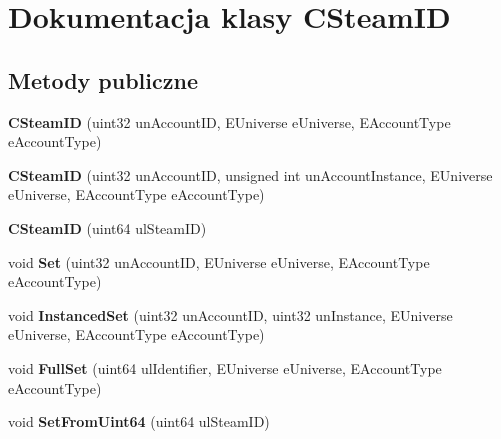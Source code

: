 \hypertarget{class_c_steam_i_d}{}\section{Dokumentacja klasy C\+Steam\+ID}
\label{class_c_steam_i_d}
\subsection*{Metody publiczne}
\begin{DoxyCompactItemize}
\item 
\mbox{\label{class_c_steam_i_d_aee9a6d20f4e904294ff5ca8f9d0f2521}} 
{\bfseries C\+Steam\+ID} (uint32 un\+Account\+ID, E\+Universe e\+Universe, E\+Account\+Type e\+Account\+Type)
\item 
\mbox{\label{class_c_steam_i_d_a66dea50fbae98a10058e86e5597fe396}} 
{\bfseries C\+Steam\+ID} (uint32 un\+Account\+ID, unsigned int un\+Account\+Instance, E\+Universe e\+Universe, E\+Account\+Type e\+Account\+Type)
\item 
\mbox{\label{class_c_steam_i_d_ab8c5add9368077f0217ea8d03e7c5743}} 
{\bfseries C\+Steam\+ID} (uint64 ul\+Steam\+ID)
\item 
\mbox{\label{class_c_steam_i_d_a46fe032f5da0e7c19154527224a28a3b}} 
void {\bfseries Set} (uint32 un\+Account\+ID, E\+Universe e\+Universe, E\+Account\+Type e\+Account\+Type)
\item 
\mbox{\label{class_c_steam_i_d_a1f511324c499386ae942ddcca19a78cf}} 
void {\bfseries Instanced\+Set} (uint32 un\+Account\+ID, uint32 un\+Instance, E\+Universe e\+Universe, E\+Account\+Type e\+Account\+Type)
\item 
\mbox{\label{class_c_steam_i_d_a6721be10705e28d39da873a0c136054b}} 
void {\bfseries Full\+Set} (uint64 ul\+Identifier, E\+Universe e\+Universe, E\+Account\+Type e\+Account\+Type)
\item 
\mbox{\label{class_c_steam_i_d_a072df3ce585dc3e5c7e43e8668c46c78}} 
void {\bfseries Set\+From\+Uint64} (uint64 ul\+Steam\+ID)
\item 
\mbox{\label{class_c_steam_i_d_ab71588633495f381bcc780722c2cdbda}} 

\end{DoxyCompactItemize}
